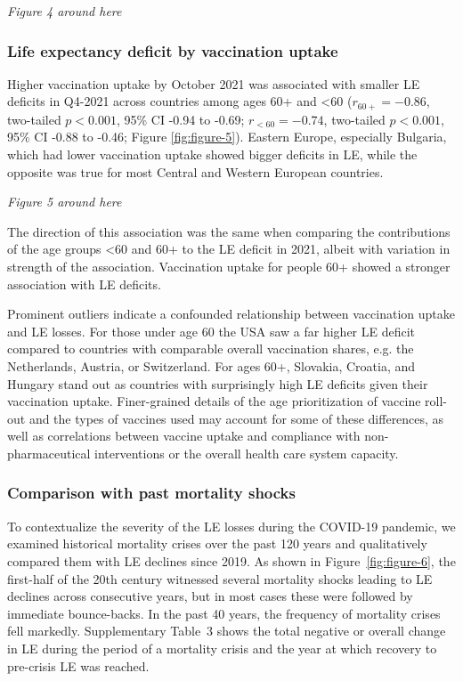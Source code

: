 \documentclass[12pt]{article}
\begin{document}
\par\medskip
\emph{Figure 4 around here}
\par\medskip

\subsubsection*{Life expectancy deficit by vaccination uptake}

Higher vaccination uptake by October 2021 was associated with smaller LE deficits in Q4-2021 across countries among ages 60+ and <60 ($r_{60+}=-0.86$, two-tailed $p < 0.001$, 95\% CI -0.94 to -0.69; $r_{<60}=-0.74$, two-tailed $p < 0.001$, 95\% CI -0.88 to -0.46; Figure \ref{fig:figure-5}). Eastern Europe, especially Bulgaria, which had lower vaccination uptake showed bigger deficits in LE, while the opposite was true for most Central and Western European countries.

\par\medskip
\emph{Figure 5 around here}
\par\medskip

The direction of this association was the same when comparing the contributions of the age groups <60 and 60+ to the LE deficit in 2021, albeit with variation in strength of the association. Vaccination uptake for people 60+ showed a stronger association with LE deficits.

Prominent outliers indicate a confounded relationship between vaccination uptake and LE losses. For those under age 60 the USA saw a far higher LE deficit compared to countries with comparable overall vaccination shares, e.g. the Netherlands, Austria, or Switzerland. For ages 60+, Slovakia, Croatia, and Hungary stand out as countries with surprisingly high LE deficits given their vaccination uptake. Finer-grained details of the age prioritization of vaccine roll-out and the types of vaccines used may account for some of these differences, as well as correlations between vaccine uptake and compliance with non-pharmaceutical interventions or the overall health care system capacity.

\subsubsection*{Comparison with past mortality shocks}

To contextualize the severity of the LE losses during the COVID-19 pandemic, we examined historical mortality crises over the past 120 years and qualitatively compared them with LE declines since 2019. As shown in Figure~\ref{fig:figure-6}, the first-half of the 20th century witnessed several mortality shocks leading to LE declines across consecutive years, but in most cases these were followed by immediate bounce-backs. In the past 40 years, the frequency of mortality crises fell markedly. Supplementary Table~3 shows the total negative or overall change in LE during the period of a mortality crisis and the year at which recovery to pre-crisis LE was reached.
\end{document}
